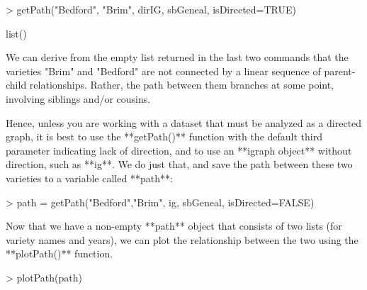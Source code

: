 \documentclass{article}
\numberwithin{equation}{section} %
\begin{document}
\begin{Schunk}
\begin{Sinput}
> getPath("Bedford", "Brim", dirIG, sbGeneal, isDirected=TRUE)
\end{Sinput}
\begin{Soutput}
list()
\end{Soutput}
\end{Schunk}

We can derive from the empty list returned in the last two commands that the varieties "Brim" and "Bedford" are not connected by a linear sequence of parent-child relationships. Rather, the path between them branches at some point, involving siblings and/or cousins.

Hence, unless you are working with a dataset that must be analyzed as a directed graph, it is best to use the **getPath()** function with the default third parameter indicating lack of direction, and to use an **igraph object** without direction, such as **ig**. We do just that, and save the path between these two varieties to a variable called **path**:

\begin{Schunk}
\begin{Sinput}
> path = getPath("Bedford","Brim", ig, sbGeneal, isDirected=FALSE)
\end{Sinput}
\end{Schunk}

Now that we have a non-empty **path** object that consists of two lists (for variety names and years), we can plot the relationship between the two using the **plotPath()** function.

\begin{Schunk}
\begin{Sinput}
> plotPath(path)
\end{Sinput}
\end{Schunk}
\end{document}
